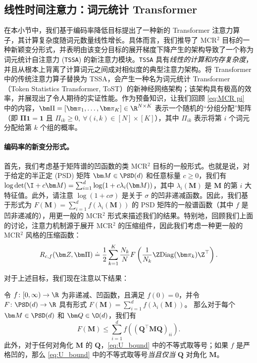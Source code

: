 \documentclass[../../book-main_zh.tex]{subfiles}
\begin{document}
\subsection{线性时间注意力：词元统计 Transformer}\label{sub:tost}

在本小节中，我们基于编码率降低目标提出了一种新的 Transformer 注意力算子，其计算复杂度随词元数量线性增长。具体而言，我们推导了 MCR$^2$ 目标的一种新颖变分形式，并表明由该变分目标的展开梯度下降产生的架构导致了一个称为词元统计自注意力 (\texttt{TSSA}) 的新注意力模块。\texttt{TSSA} 具有{\em 线性的计算和内存复杂度}，并且从根本上背离了计算词元之间成对相似度的典型注意力架构。将 Transformer 中的传统注意力算子替换为 TSSA，会产生一种名为词元统计 Transformer（Token Statistics Transformer, ToST）的新神经网络架构；该架构具有极高的效率，并展现出了令人期待的实证性能。作为预备知识，让我们回顾 \eqref{eq:MCR pi} 中的内容，$\bm \Pi = [\bm \pi_1, \ldots, \bm \pi_K] \in \R^{N \times K}$ 表示一个随机的“分组分配”矩阵（即 $\bm \Pi \bm
    1 = \bm 1$ 且 $\Pi_{ik} \geq 0, \  \forall (i,k) \in [N] \times [K]$），其中 $\Pi_{ik}$ 表示将第 $i$ 个词元分配给第 $k$ 个组的概率。

\paragraph{编码率的新变分形式。} 首先，我们考虑基于矩阵谱的凹函数的类 MCR$^2$ 目标的一般形式。也就是说，对于给定的半正定 (PSD) 矩阵 $\bm M \in \PSD(d)$ 和任意标量 $c \geq 0$，我们有 $\log \det (\I + c \bm M) = \sum_{i=1}^{d} \log( 1 + c \lambda_i(\bm
M))$，其中 $\lambda_i (\bm M)$ 是 $\bm M$ 的第 $i$ 大特征值。此外，请注意 $\log(1 + c \sigma)$ 是关于 $\sigma$ 的凹非递减函数。因此，我们基于形式为 $F(\bm M) = \sum_{i=1}^{d}
f(\lambda_i(\bm M))$ 的 PSD 矩阵的一般谱函数（其中 $f$ 是凹非递减的），用更一般的 MCR$^2$ 形式来描述我们的结果。特别地，回顾我们上面的讨论，注意力机制源于展开 MCR$^2$ 的压缩组件，因此我们考虑一种更一般的 MCR$^2$ 风格的压缩函数：
\vspace{-2mm}
\begin{equation}
    R_{c,f}(\bm Z, \bm \Pi) \doteq \frac{1}{2}\sum_{k=1}^K
    \frac{N_k}{N} F\left( \frac{1}{N_k}\Z \mathrm{Diag}(\bm \pi_k)
    \Z^{\top} \right).
    \label{eq:mcr_c_gen}
\end{equation}

对于上述目标，我们现在注意以下结果：
\begin{theorem}
    \label{thm:var_concave}
    令 \(f \colon [0, \infty) \to \R\) 为非递减、凹函数，且满足 \(f(0) = 0\)，并令 \(F \colon \PSD(d) \to \R\) 具有形式 \(F(\bm M) = \sum_{i = 1}^{d}f(\lambda_{i}(\bm M))\)。
    那么对于每个 \(\bm M \in \PSD(d)\) 和 \(\bm Q \in \O(d)\)，我们有
    \begin{equation}
        \label{eq:U_bound}
        F(\bm M) \leq  \sum_{i=1}^{d} f\left( (\bm Q^{\top} \bm M \bm
        Q)_{ii} \right).
    \end{equation}
    此外，对于任何对角化 $\bm M$ 的 $\bm Q$，\eqref{eq:U_bound} 中的不等式取等号；如果 $f$ 是严格凹的，那么 \eqref{eq:U_bound} 中的不等式取等号\textit{当且仅当} $\bm Q$ 对角化 $\bm M$。
\end{theorem}
\end{document}
